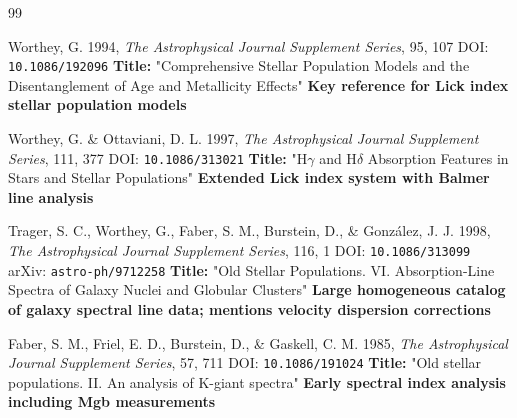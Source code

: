 \begin{thebibliography}{99}

Worthey, G. 1994, \textit{The Astrophysical Journal Supplement Series}, 95, 107
\newline DOI: \texttt{10.1086/192096}
\newline \textbf{Title:} "Comprehensive Stellar Population Models and the Disentanglement of Age and Metallicity Effects"
\newline \textbf{Key reference for Lick index stellar population models}

Worthey, G. \& Ottaviani, D. L. 1997, \textit{The Astrophysical Journal Supplement Series}, 111, 377
\newline DOI: \texttt{10.1086/313021}
\newline \textbf{Title:} "H$\gamma$ and H$\delta$ Absorption Features in Stars and Stellar Populations"
\newline \textbf{Extended Lick index system with Balmer line analysis}

Trager, S. C., Worthey, G., Faber, S. M., Burstein, D., \& González, J. J. 1998, \textit{The Astrophysical Journal Supplement Series}, 116, 1
\newline DOI: \texttt{10.1086/313099}
\newline arXiv: \texttt{astro-ph/9712258}
\newline \textbf{Title:} "Old Stellar Populations. VI. Absorption-Line Spectra of Galaxy Nuclei and Globular Clusters"
\newline \textbf{Large homogeneous catalog of galaxy spectral line data; mentions velocity dispersion corrections}

Faber, S. M., Friel, E. D., Burstein, D., \& Gaskell, C. M. 1985, \textit{The Astrophysical Journal Supplement Series}, 57, 711
\newline DOI: \texttt{10.1086/191024}
\newline \textbf{Title:} "Old stellar populations. II. An analysis of K-giant spectra"
\newline \textbf{Early spectral index analysis including Mgb measurements}



\end{thebibliography}
